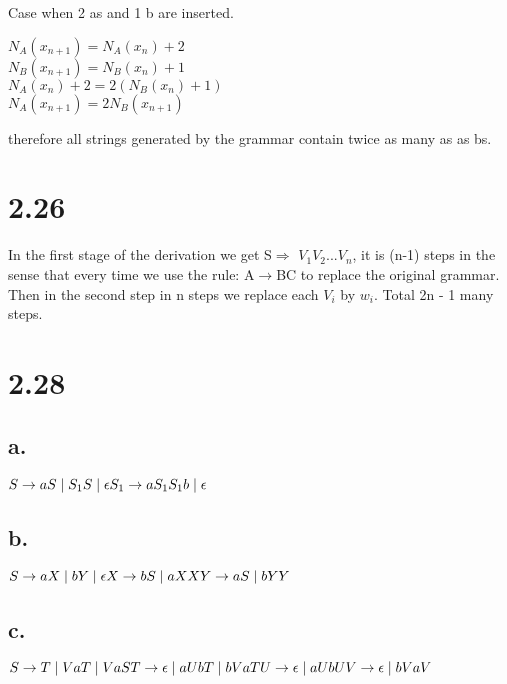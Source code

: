 \documentclass{scrartcl}
\begin{document}
Case when 2 a\textquotesingle s and 1 b are inserted.\\

\begin{center}
	
	$N_A(x_{n+1}) = N_A(x_n) + 2$\\
	$N_B(x_{n+1}) = N_B(x_n) + 1$\\
	$N_A(x_n) + 2 = 2(N_B(x_n) + 1)$\\
	$N_A(x_{n+1}) = 2N_B(x_{n+1})
	$
	
\end{center}

therefore all strings generated by the grammar contain twice as many a\textquotesingle s as b\textquotesingle s. 

\section*{2.26}
In the first stage of the derivation we get S$\Rightarrow$ $V_1V_2...V_n$, it is (n-1) steps in the sense that every time we use the rule: A$\rightarrow$BC to replace the original grammar. Then in the second step in n steps we replace each $V_i$ by $w_i$. Total 2n - 1 many steps.



\section*{2.28}
\subsection*{a.}
$S\rightarrow aS \mid S_1 S \mid \epsilon\\
S_1\rightarrow aS_1S_1b \mid \epsilon$



\subsection*{b.}
$S\rightarrow aX \mid bY \mid \epsilon\\
X\rightarrow bS \mid aXX\\
Y\rightarrow aS \mid bYY$
\subsection*{c.}
$
S\rightarrow T \mid VaT \mid VaS\\
T\rightarrow \epsilon \mid aUbT \mid bVaT\\
U\rightarrow \epsilon \mid aUbU\\
V\rightarrow \epsilon \mid bVaV$
\end{document}
